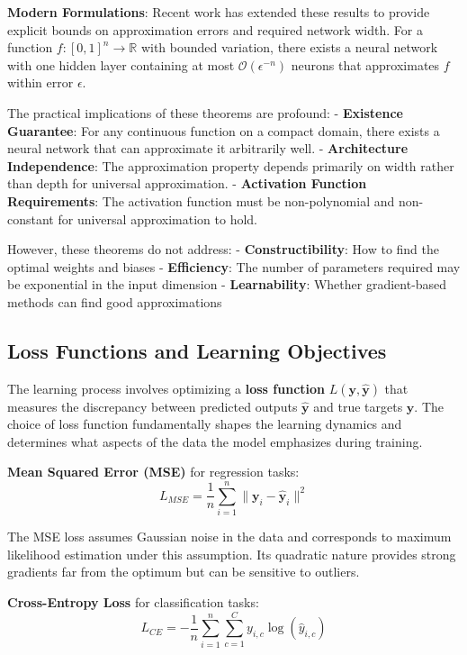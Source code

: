 \documentclass[11pt,a4paper]{report}
\begin{document}
\textbf{Modern Formulations}: Recent work has extended these results to provide explicit bounds on approximation errors and required network width. For a function $f: [0,1]^n \rightarrow \mathbb{R}$ with bounded variation, there exists a neural network with one hidden layer containing at most $\mathcal{O}(\epsilon^{-n})$ neurons that approximates $f$ within error $\epsilon$.

The practical implications of these theorems are profound:
- \textbf{Existence Guarantee}: For any continuous function on a compact domain, there exists a neural network that can approximate it arbitrarily well.
- \textbf{Architecture Independence}: The approximation property depends primarily on width rather than depth for universal approximation.
- \textbf{Activation Function Requirements}: The activation function must be non-polynomial and non-constant for universal approximation to hold.

However, these theorems do not address:
- \textbf{Constructibility}: How to find the optimal weights and biases
- \textbf{Efficiency}: The number of parameters required may be exponential in the input dimension
- \textbf{Learnability}: Whether gradient-based methods can find good approximations

\subsection{Loss Functions and Learning Objectives}

The learning process involves optimizing a \textbf{loss function} $L(\mathbf{y}, \hat{\mathbf{y}})$ that measures the discrepancy between predicted outputs $\hat{\mathbf{y}}$ and true targets $\mathbf{y}$. The choice of loss function fundamentally shapes the learning dynamics and determines what aspects of the data the model emphasizes during training.

\textbf{Mean Squared Error (MSE)} for regression tasks:
\begin{equation}
L_{MSE} = \frac{1}{n} \sum_{i=1}^{n} \|\mathbf{y}_i - \hat{\mathbf{y}}_i\|^2
\end{equation}

The MSE loss assumes Gaussian noise in the data and corresponds to maximum likelihood estimation under this assumption. Its quadratic nature provides strong gradients far from the optimum but can be sensitive to outliers.

\textbf{Cross-Entropy Loss} for classification tasks:
\begin{equation}
L_{CE} = -\frac{1}{n} \sum_{i=1}^{n} \sum_{c=1}^{C} y_{i,c} \log(\hat{y}_{i,c})
\end{equation}
\end{document}
